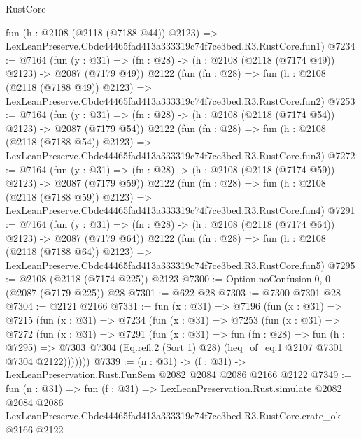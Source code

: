 \begin{lexlean}{RustCore}
\begin{coremodule}
    fun (h : @2108 (@2118 (@7188 @44)) @2123) =>
    LexLeanPreserve.Cbdc44465fad413a333319c74f7ce3bed.R3.RustCore.fun1)
@7234 := @7164
    (fun (y : @31) => (fn : @28) -> (h : @2108 (@2118 (@7174 @49)) @2123) -> @2087 (@7179 @49))
    @2122
    (fun (fn : @28) =>
    fun (h : @2108 (@2118 (@7188 @49)) @2123) =>
    LexLeanPreserve.Cbdc44465fad413a333319c74f7ce3bed.R3.RustCore.fun2)
@7253 := @7164
    (fun (y : @31) => (fn : @28) -> (h : @2108 (@2118 (@7174 @54)) @2123) -> @2087 (@7179 @54))
    @2122
    (fun (fn : @28) =>
    fun (h : @2108 (@2118 (@7188 @54)) @2123) =>
    LexLeanPreserve.Cbdc44465fad413a333319c74f7ce3bed.R3.RustCore.fun3)
@7272 := @7164
    (fun (y : @31) => (fn : @28) -> (h : @2108 (@2118 (@7174 @59)) @2123) -> @2087 (@7179 @59))
    @2122
    (fun (fn : @28) =>
    fun (h : @2108 (@2118 (@7188 @59)) @2123) =>
    LexLeanPreserve.Cbdc44465fad413a333319c74f7ce3bed.R3.RustCore.fun4)
@7291 := @7164
    (fun (y : @31) => (fn : @28) -> (h : @2108 (@2118 (@7174 @64)) @2123) -> @2087 (@7179 @64))
    @2122
    (fun (fn : @28) =>
    fun (h : @2108 (@2118 (@7188 @64)) @2123) =>
    LexLeanPreserve.Cbdc44465fad413a333319c74f7ce3bed.R3.RustCore.fun5)
@7295 := @2108 (@2118 (@7174 @225)) @2123
@7300 := Option.noConfusion.{0, 0} (@2087 (@7179 @225)) @28
@7301 := @622 @28
@7303 := @7300 @7301 @28
@7304 := @2121 @2166
@7331 := fun (x : @31) =>
  @7196
    (fun (x : @31) =>
    @7215
      (fun (x : @31) =>
      @7234
        (fun (x : @31) =>
        @7253
          (fun (x : @31) =>
          @7272
            (fun (x : @31) =>
            @7291
              (fun (x : @31) =>
              fun (fn : @28) =>
              fun (h : @7295) =>
              @7303 @7304 (Eq.refl.{2} (Sort 1) @28) (heq_of_eq.{1} @2107 @7301 @7304 @2122)))))))
@7339 := (n : @31) -> (f : @31) -> LexLeanPreservation.Rust.FunSem @2082 @2084 @2086 @2166 @2122
@7349 := fun (n : @31) =>
  fun (f : @31) =>
  LexLeanPreservation.Rust.simulate
    @2082
    @2084
    @2086
    LexLeanPreserve.Cbdc44465fad413a333319c74f7ce3bed.R3.RustCore.crate_ok
    @2166
    @2122
\end{coremodule}
\end{lexlean}
